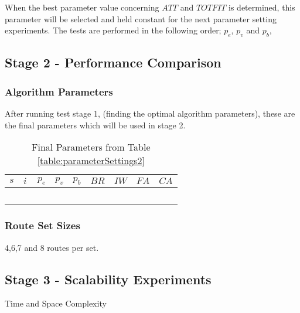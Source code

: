 When the best parameter value concerning $ATT$ and $TOTFIT$ is determined, this parameter will be selected and held constant for the next parameter setting experiments. The tests are performed in the following order; $p_{e}$, $p_{v}$ and $p_{b}$, 

\subsection{Stage 2 - Performance Comparison}

\subsubsection{Algorithm Parameters}
After running test stage 1, (finding the optimal algorithm parameters), these are the final parameters which will be used in stage 2.

\begin{table}[H]
	\centering
    \begin{tabular}{|l|l|l|l|l|l|l|l|l|}
 	\hline
 	$s$ & $i$ & $p_{e}$ & $p_{v}$ & $p_{b}$ & $BR$  & $IW$ & $FA$ & $CA$  \\
 	\hline
    ~ & ~ & ~ & ~ & ~ & ~ & ~ & ~  & ~  \\
	\hline
    \end{tabular}
    \caption {Final Parameters from Table \ref{table:parameterSettings2}}
    \label{table:finalParameters}
	\end{table}

\subsubsection{Route Set Sizes}
4,6,7 and 8 routes per set.

\subsection{Stage 3 -  Scalability Experiments}
Time and Space Complexity
